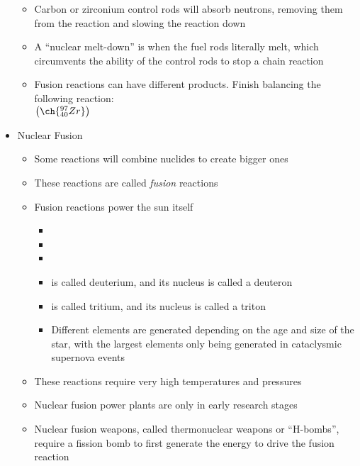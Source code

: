 \documentclass[12pt, openany, letterpaper]{memoir}
\begin{document}
\begin{itemize}
\begin{itemize}
		\item Carbon or zirconium control rods will absorb neutrons, removing them from the reaction and slowing the reaction down
		\item A ``nuclear melt-down'' is when the fuel rods literally melt, which circumvents the ability of the control rods to stop a chain reaction 
		\item Fusion reactions can have different products. Finish balancing the following reaction:\\
		 \hspace{2em} $\left(\ch{^{97}_{40}Zr}\right)$		
	\end{itemize}
	\item Nuclear Fusion
	\begin{itemize}
		\item Some reactions will combine nuclides to create bigger ones
		\item These reactions are called \emph{fusion} reactions
		\item Fusion reactions power the sun itself
		\begin{itemize}
			\item {}
			\item {}
			\item {}
			\item {} is called deuterium, and its nucleus is called a deuteron
			\item {} is called tritium, and its nucleus is called a triton
			\item Different elements are generated depending on the age and size of the star, with the largest elements only being generated in cataclysmic supernova events
		\end{itemize}
		\item These reactions require very high temperatures and pressures
		\item Nuclear fusion power plants are only in early research stages
		\item Nuclear fusion weapons, called thermonuclear weapons or ``H-bombs'', require a fission bomb to first generate the energy to drive the fusion reaction
	\end{itemize}
\end{itemize}
\end{document}
